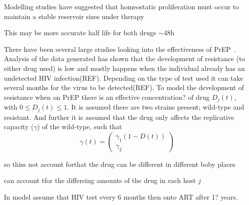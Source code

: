 \documentclass[DIV=15]{scrartcl}
\begin{document}
 \iffalse
some stuff about  tenofovir resistane mutatns
\url{http://www.ncbi.nlm.nih.gov/pmc/articles/PMC3494163/}


rho is outflow -inflow no mutation low rtae in this model $ \rho = a-k/r_L$


mean generstion time in reservoir is1/a HIV

viral geneeration  is 1 day in active compartment 

\fi

Modelling studies have suggested that homeostatic proliferation must occur to maintain a stable reservoir sizes under therapy~\cite{kim2006,rong2009} 



 This may be more accurate half life for both drugs $\sim 48$h~\cite{patterson2011}

There have been several large studies looking into the effectiveness of PrEP~\cite{iprex2011,partners2012}. Analysis of the data  generated has shown that the development of resistance (to either drug used) is low and mostly happens when the individual already has an undetected HIV infection(REF). Depending on the type of test used  it can take several months for the virus to be detected(REF). To  model the development of resistance when on PrEP there is an effective concentration? of drug $D_j(t)$, with $0 \leq D_j(t) \leq 1$. It is assumed there are two strains present; wild-type and resistant. And further it is assumed that the drug only affects the replicative  capacity ($\gamma$) of the wild-type, such that \begin{equation*}
 \gamma(t) = \begin{pmatrix} \gamma_1(1- D(t)) \\ \gamma_2 \end{pmatrix}
\end{equation*}



so thiss not account forthat the drug can be different in different boby places 

can account tfor  the differeing amounts of the drug in each host $j$



\iffalse










In model assume that HIV test every 6 months then onto ART after 1?  years.


\end{document}
